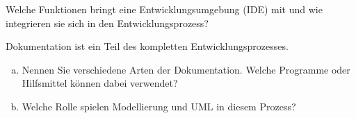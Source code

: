     
    
        \begin{aufgabe}
            Welche Funktionen bringt eine Entwicklungsumgebung (IDE) mit und wie integrieren sie sich in den Entwicklungsprozess?
        \end{aufgabe}
    
        \begin{loesung}\:
            
        \end{loesung}
	
    
    
        \begin{aufgabe}
            Dokumentation ist ein Teil des kompletten Entwicklungsprozesses.
            \\[-.7cm]\begin{enumerate}[(a)]
                \setlength\itemsep{0.1px}
                \item Nennen Sie verschiedene Arten der Dokumentation. Welche Programme oder Hilfsmittel können dabei verwendet?
                \item Welche Rolle spielen Modellierung und UML in diesem Prozess?
            \end{enumerate}
        \end{aufgabe}
    
        \begin{loesung}\:
            
        \end{loesung}
	
